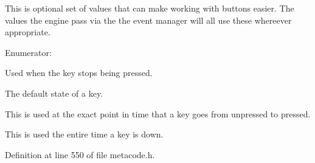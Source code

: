 This is optional set of values that can make working with buttons easier. The values the engine pass via the the event manager will all use these whereever appropriate. \begin{Desc}
\item[Enumerator: ]\par
\begin{description}
\item[{\em 
\hypertarget{classMezzanine_1_1MetaCode_a65b6d86ef846369bd8f3fd944a455fd0a07ca860b5b6b505052022d842f155080}{
BUTTON\_\-LIFTING}
\label{classMezzanine_1_1MetaCode_a65b6d86ef846369bd8f3fd944a455fd0a07ca860b5b6b505052022d842f155080}
}]Used when the key stops being pressed. \item[{\em 
\hypertarget{classMezzanine_1_1MetaCode_a65b6d86ef846369bd8f3fd944a455fd0a100e16dc4d4e866189e42ab81398f6e9}{
BUTTON\_\-UP}
\label{classMezzanine_1_1MetaCode_a65b6d86ef846369bd8f3fd944a455fd0a100e16dc4d4e866189e42ab81398f6e9}
}]The default state of a key. \item[{\em 
\hypertarget{classMezzanine_1_1MetaCode_a65b6d86ef846369bd8f3fd944a455fd0a9150dbdf88f3013383a72366904cb749}{
BUTTON\_\-PRESSING}
\label{classMezzanine_1_1MetaCode_a65b6d86ef846369bd8f3fd944a455fd0a9150dbdf88f3013383a72366904cb749}
}]This is used at the exact point in time that a key goes from unpressed to pressed. \item[{\em 
\hypertarget{classMezzanine_1_1MetaCode_a65b6d86ef846369bd8f3fd944a455fd0af66afc958f5eb62b8b836897d062b62b}{
BUTTON\_\-DOWN}
\label{classMezzanine_1_1MetaCode_a65b6d86ef846369bd8f3fd944a455fd0af66afc958f5eb62b8b836897d062b62b}
}]This is used the entire time a key is down. \end{description}
\end{Desc}



Definition at line 550 of file metacode.h.

